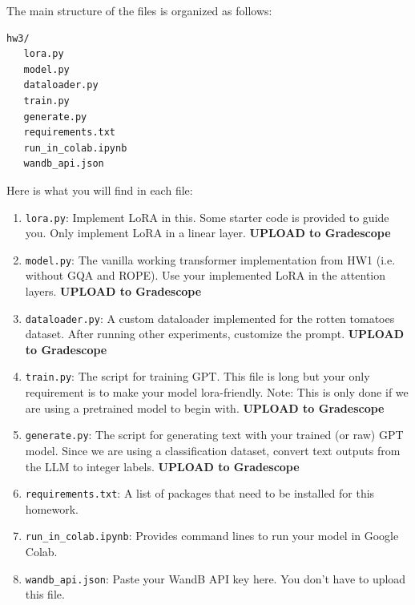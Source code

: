 \documentclass[11pt,addpoints,answers]{exam}
\begin{document}
\begin{questions}

The main structure of the files is organized as follows:
\begin{verbatim}
hw3/
   lora.py
   model.py
   dataloader.py
   train.py
   generate.py
   requirements.txt
   run_in_colab.ipynb
   wandb_api.json
\end{verbatim}
Here is what you will find in each file:
\begin{enumerate}
    
    \item \lstinline{lora.py}: Implement LoRA in this. Some starter code is provided to guide you. Only implement LoRA in a linear layer. \textbf{UPLOAD to Gradescope}

    \item \lstinline{model.py}: The vanilla working transformer implementation from HW1 (i.e. without GQA and ROPE). Use your implemented LoRA in the attention layers. \textbf{UPLOAD to Gradescope}

    \item \lstinline{dataloader.py}: A custom dataloader implemented for the rotten tomatoes dataset. After running other experiments, customize the prompt. \textbf{UPLOAD to Gradescope}
    
    \item \lstinline{train.py}: The script for training GPT. This file is long but your only requirement is to make your model lora-friendly. Note: This is only done if we are using a pretrained model to begin with. \textbf{UPLOAD to Gradescope}
    
    \item \lstinline{generate.py}: The script for generating text with your trained (or raw) GPT model. Since we are using a classification dataset, convert text outputs from the LLM to integer labels. \textbf{UPLOAD to Gradescope}

    \item \lstinline{requirements.txt}: A list of packages that need to be installed for this homework.

    \item \lstinline{run_in_colab.ipynb}: Provides command lines to run your model in Google Colab. 

    \item \lstinline{wandb_api.json}: Paste your WandB API key here. You don't have to upload this file.


\end{enumerate}
\end{questions}
\end{document}

